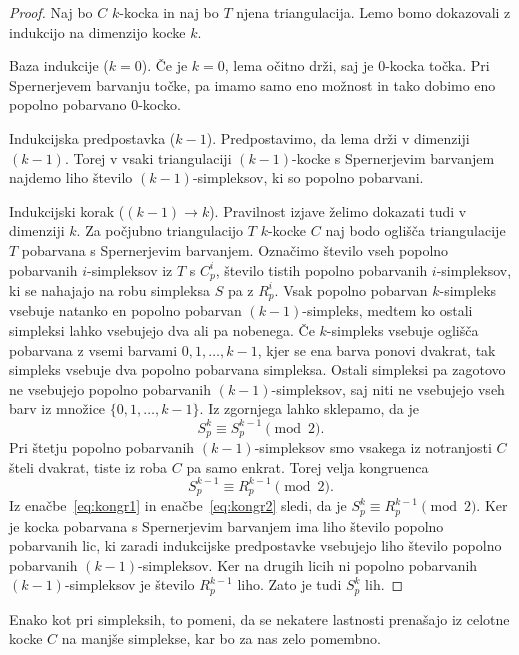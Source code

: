 \documentclass[mat1]{fmfdelo}
\newcommand{\0}{\underline{0}}
\begin{document}
\begin{proof}
Naj bo $C$ $k$-kocka in naj bo $T$ njena triangulacija. Lemo bomo dokazovali z indukcijo na dimenzijo kocke $k$.

Baza indukcije ($k = 0$).
Če je $k=0$, lema očitno drži, saj je $0$-kocka točka. Pri Spernerjevem barvanju točke, pa imamo samo eno možnost in tako dobimo eno popolno pobarvano $0$-kocko.

Indukcijska predpostavka ($k - 1$).
Predpostavimo, da lema drži v dimenziji $(k - 1)$. Torej v vsaki triangulaciji $(k - 1)$-kocke s Spernerjevim barvanjem najdemo liho število $(k - 1)$-simpleksov, ki so popolno pobarvani.

Indukcijski korak ($(k - 1) \rightarrow k$).
Pravilnost izjave želimo dokazati tudi v dimenziji $k$. Za počjubno triangulacijo $T$ $k$-kocke $C$ naj bodo oglišča triangulacije $T$ pobarvana s Spernerjevim barvanjem. Označimo število vseh popolno pobarvanih $i$-simpleksov iz $T$ s $C_p^i$, število tistih popolno pobarvanih $i$-simpleksov, ki se nahajajo na robu simpleksa $S$ pa z $R_p^i$. Vsak popolno pobarvan $k$-simpleks vsebuje natanko en popolno pobarvan $(k-1)$-simpleks, medtem ko ostali simpleksi lahko vsebujejo dva ali pa nobenega. Če $k$-simpleks vsebuje oglišča pobarvana z vsemi barvami $0, 1, \dots, k-1$, kjer se ena barva ponovi dvakrat, tak simpleks vsebuje dva popolno pobarvana simpleksa. Ostali simpleksi pa zagotovo ne vsebujejo popolno pobarvanih $(k - 1)$-simpleksov, saj niti ne vsebujejo vseh barv iz množice $\{0, 1, \dots, k-1 \}$. Iz zgornjega lahko sklepamo, da je
\begin{equation}\label{eq:kongr1}
S_p^k \equiv S_p^{k-1} \pmod 2.
\end{equation}
Pri štetju popolno pobarvanih $(k - 1)$-simpleksov smo vsakega iz notranjosti $C$ šteli dvakrat, tiste iz roba $C$ pa samo enkrat. Torej velja kongruenca 
\begin{equation}\label{eq:kongr2}
S_p^{k-1} \equiv R_p^{k - 1} \pmod 2.
\end{equation}
Iz enačbe~\ref{eq:kongr1} in enačbe~\ref{eq:kongr2} sledi, da je $S_p^k \equiv R_p^{k - 1} \pmod 2$.
Ker je kocka pobarvana s Spernerjevim barvanjem ima liho število popolno pobarvanih lic, ki zaradi indukcijske predpostavke vsebujejo liho število popolno pobarvanih $(k - 1)$-simpleksov. Ker na drugih licih ni popolno pobarvanih $(k - 1)$-simpleksov je število $R_p^{k - 1}$ liho. Zato je tudi $S_p^k$ lih.
\end{proof}
Enako kot pri simpleksih, to pomeni, da se nekatere lastnosti prenašajo iz celotne kocke $C$ na manjše simplekse, kar bo za nas zelo pomembno.
%
\end{document}
